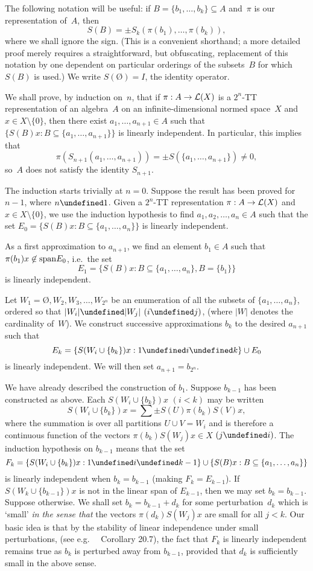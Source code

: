 \documentclass[11pt]{article}
\newcommand{\eg}{e.g.\ }
\newcommand{\ie}{i.e.\ }
\newcommand{\sseq}{\subseteq}
\let\leq\undefined  \let\geq\undefined
\let\le\leq   \let\ge\geq
\newcommand{\nin}{\not\in}
\renewcommand{\emptyset}{\mbox{\O}}
\newenvironment{Proof}{{\it Proof. }}{}%
\newcommand{\LX}{{\cal L}(X)}
\begin{document}
\begin{Proof}
The following notation will be useful:  if $B = \{b_1,\dots,b_k\} \sseq A$
and~$\pi$ is our representation of~$A$, then
$$S(B) = \pm S_k(\pi(b_1),\dots,\pi(b_k)),$$
where we shall ignore the sign.  (This is a convenient shorthand; a more
detailed proof merely requires a straightforward, but obfuscating, replacement
of this notation by one dependent on particular orderings of the subsets~$B$ for
which $S(B)$ is used.)   We write $S(\emptyset) = I$, the identity operator.

We shall prove, by induction on~$n$, that if $\pi:A \to \LX$ is a
$2^n$-TT representation of an algebra~$A$ on an
infinite-dimensional normed space~$X$ and $x \in X\setminus\{0\}$, then
there exist $a_1,\dots,a_{n+1} \in A$ such that
$\{S(B)x: B \sseq \{a_1,\dots,a_{n+1}\}\}$ is linearly independent.
In particular, this implies that
$$\pi(S_{n+1}(a_1,\dots,a_{n+1})) = \pm S(\{a_1,\dots,a_{n+1}\}) \ne 0,$$
so~$A$ does not satisfy the identity $S_{n+1}$.

The induction starts trivially at $n=0$.
Suppose the result has been proved for $n-1$, where $n \ge 1$.   Given
a $2^n$-TT representation $\pi:A \to \LX$ and $x \in X\setminus\{0\}$, we use
the induction hypothesis to find $a_1,a_2,\dots,a_n \in A$ such that the set
$E_0=\{S(B)x: B \sseq \{a_1,\dots,a_n\}\}$ is linearly independent.

As a first approximation to $a_{n+1}$, we find an element $b_1 \in A$ such that
$\pi(b_1)x \nin {\rm span} E_0$, \ie the set
$$E_1 = \{S(B)x: B \sseq \{a_1,\dots,a_n\}, B=\{b_1\}\}$$
is linearly independent.

Let $W_1=\emptyset,W_2,W_3,\dots,W_{2^n}$ be an enumeration of all the subsets
of $\{a_1,\dots,a_n\}$, ordered so that $|W_i| \le |W_j|$ $(i \le j)$,
(where $|W|$ denotes the cardinality of~$W$).
We construct successive approximations
$b_k$ to the desired $a_{n+1}$ such that
$$E_k = \{S(W_i\cup \{b_k\})x:1 \le i \le k\}\cup E_0$$
is linearly independent.  We will then set $a_{n+1}=b_{2^n}$.

We have already described the construction of $b_1$.   Suppose $b_{k-1}$ has
been constructed as above.   Each $S(W_i\cup \{b_k\})x$ $(i<k)$ may be written
$$S(W_i\cup \{b_k\})x = \sum\pm S(U)\pi(b_k)S(V)x,$$
where the summation is over all partitions $U \cup V = W_i$
and is therefore a continuous function of the vectors $\pi(b_k)S(W_j)x \in X$
$(j \le i)$.   The induction hypothesis on $b_{k-1}$ means that the set
$$F_k=\{S(W_i\cup \{b_k\})x:1 \le i \le k-1\}\cup
                                  \{S(B)x: B \sseq \{a_1,\dots,a_n\}\}$$
is linearly independent when $b_k = b_{k-1}$ (making $F_k=E_{k-1}$).
If $S(W_k\cup \{b_{k-1}\})x$ is not in the linear span of $E_{k-1}$, then we
may set $b_k = b_{k-1}$. Suppose otherwise.  We shall set $b_k = b_{k-1} + d_k$
for some perturbation~$d_k$ which is `small' {\em in the sense that} the vectors
$\pi(d_k)S(W_j)x$ are small for all $j < k$.  Our basic idea is that by the
stability of linear independence under small perturbations,  (see \eg\
\cite{Jameson} Corollary 20.7), the fact that $F_k$ is linearly independent
remains true as $b_k$ is perturbed away from $b_{k-1}$, provided that $d_k$ is
sufficiently small in the above sense.


\end{Proof}
\end{document}
